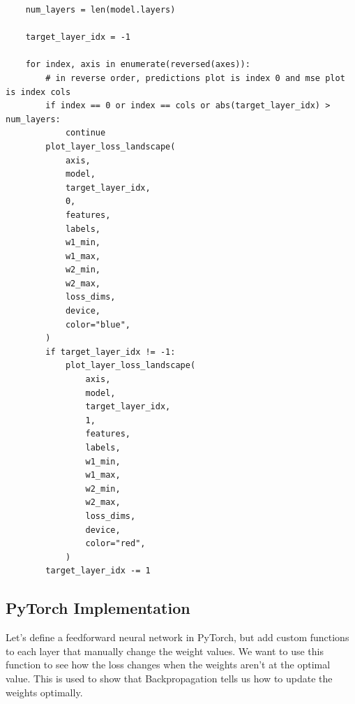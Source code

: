 \documentclass[openany]{book}
\begin{document}
\begin{tcolorbox}
\begin{verbatim}
    num_layers = len(model.layers)

    target_layer_idx = -1

    for index, axis in enumerate(reversed(axes)):
        # in reverse order, predictions plot is index 0 and mse plot is index cols
        if index == 0 or index == cols or abs(target_layer_idx) > num_layers:
            continue
        plot_layer_loss_landscape(
            axis,
            model,
            target_layer_idx,
            0,
            features,
            labels,
            w1_min,
            w1_max,
            w2_min,
            w2_max,
            loss_dims,
            device,
            color="blue",
        )
        if target_layer_idx != -1:
            plot_layer_loss_landscape(
                axis,
                model,
                target_layer_idx,
                1,
                features,
                labels,
                w1_min,
                w1_max,
                w2_min,
                w2_max,
                loss_dims,
                device,
                color="red",
            )
        target_layer_idx -= 1
\end{verbatim}
\end{tcolorbox}

    \subsection{PyTorch Implementation}\label{pytorch-implementation}

Let's define a feedforward neural network in PyTorch, but add custom
functions to each layer that manually change the weight values. We want
to use this function to see how the loss changes when the weights aren't
at the optimal value. This is used to show that Backpropagation tells us
how to update the weights optimally.
\end{document}
